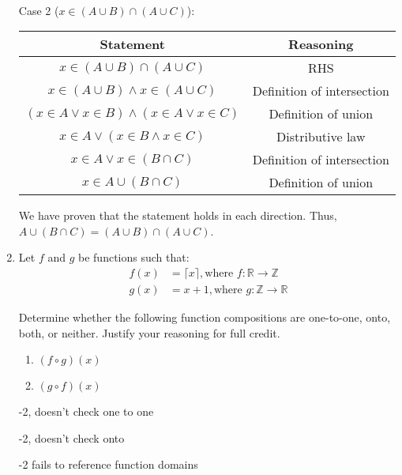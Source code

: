 \begin{enumerate}
\begin{solution}
\begin{tabular}{c|c}
\end{tabular}\\
Case 2 ($x \in (A \cup B) \cap (A \cup C)$):\\
\begin{tabular}{c|c}
    Statement & Reasoning \\
    \hline
    $x \in (A \cup B) \cap (A \cup C)$ & RHS \\
    $x \in (A \cup B) \land x \in (A \cup C)$ & Definition of intersection \\
    $(x \in A \lor x \in B) \land (x \in A \lor x \in C)$ & Definition of union \\
    $x \in A \lor (x \in B \land x \in C)$ & Distributive law \\
    $x \in A \lor x \in (B \cap C)$ & Definition of intersection \\
    $x \in A \cup (B \cap C)$ & Definition of union\\
\end{tabular}

We have proven that the statement holds in each direction. Thus, $A \cup (B \cap C) = (A \cup B) \cap (A \cup C)$. \qedsymbol

\end{solution}

\item Let $f$ and $g$ be functions such that: 
\begin{align*}
    f(x) &= \lceil x \rceil, \text{where } f : \mathbb{R} \rightarrow \mathbb{Z}\\
    g(x) &= x+1, \text{where } g : \mathbb{Z} \rightarrow \mathbb{R}
 \end{align*}

Determine whether the following function compositions are one-to-one, onto, both, or neither. Justify your reasoning for full credit.

\begin{enumerate}
    \item $(f \circ g)(x)$
    \item $(g \circ f)(x)$
\end{enumerate}

\begin{rubric}
    -2, doesn't check one to one
    
    -2, doesn't check onto
    
    -2 fails to reference function domains
\end{rubric}

\begin{solution}


\end{solution}
\end{enumerate}
